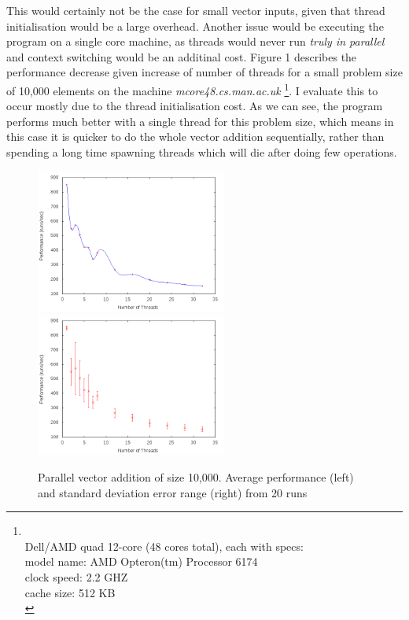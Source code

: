 \documentclass{article}
\begin{document}
  This would certainly not be the case for small vector inputs, given that thread initialisation would be a large overhead.
  Another issue would be executing the program on a single core machine, as threads would never run \textit{truly in parallel} and context switching would be an additinal cost.
  Figure 1 describes the performance decrease given increase of number of threads for a small problem size of 10,000 elements on the machine \textit{mcore48.cs.man.ac.uk}  \footnote{\label{machinespecs} \\
  Dell/AMD quad 12-core (48 cores total), each with specs:\\
  model name: AMD Opteron(tm) Processor 6174 \\
  clock speed: 2.2 GHZ \\
  cache size: 512 KB \\}. I evaluate this to occur mostly due to the thread initialisation cost. As we can see, the program performs much better with a single thread for this problem size, which means in this case it is quicker to do the whole vector addition sequentially, rather than spending a long time spawning threads which will die after doing few operations.
\newpage
\begin{figure}[t]
\centerline{%
\includegraphics[width=0.56\textwidth]{10k_lines}%
\includegraphics[width=0.56\textwidth]{10k_errorbars}%
}%
\caption{Parallel vector addition of size 10,000. Average performance (left) and standard deviation error range (right) from 20 runs}
\end{figure}
  
\end{document}
